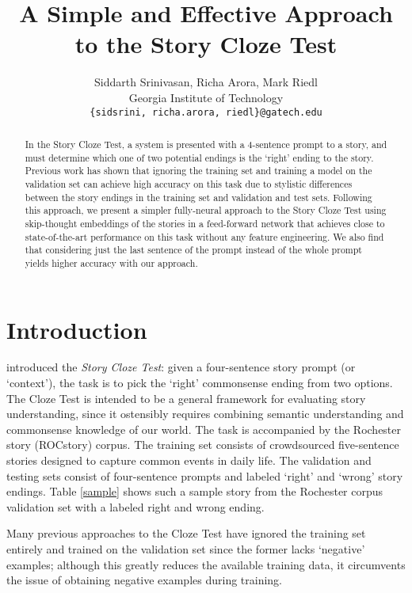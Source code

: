 \documentclass[11pt,a4paper]{article}
\title{A Simple and Effective Approach to the Story Cloze Test}
\author{Siddarth Srinivasan, Richa Arora, Mark Riedl \\
 Georgia Institute of Technology \\
  {\tt \{sidsrini, richa.arora, riedl\}@gatech.edu}}
\date{}
\begin{document}
\maketitle
\begin{abstract}
  In the Story Cloze Test, a system is presented with a 4-sentence prompt to a story, and must determine which one of two potential endings is the `right' ending to the story. Previous work has shown that ignoring the training set and training a model on the validation set can achieve high accuracy on this task due to stylistic differences between the story endings in the training set and validation and test sets. Following this approach, we present a simpler fully-neural approach to the Story Cloze Test using skip-thought embeddings of the stories in a feed-forward network that achieves close to state-of-the-art performance on this task without any feature engineering. We also find that considering just the last sentence of the prompt instead of the whole prompt yields higher accuracy with our approach.
\end{abstract}

\section{Introduction}

\citet{mostafazadeh2016corpus} introduced the {\em Story Cloze Test}: given a four-sentence story prompt (or `context'), the task is to pick the `right' commonsense ending from two options. The Cloze Test is intended to be a general framework for evaluating story understanding, since it ostensibly requires combining semantic understanding and commonsense knowledge of our world. The task is accompanied by the Rochester story (ROCstory) corpus.
The training set consists of crowdsourced five-sentence stories designed to capture common events in daily life.
The validation and testing sets consist of four-sentence prompts and labeled `right' and `wrong' story endings. Table \ref{sample} shows such a sample story from the Rochester corpus validation set with a labeled right and wrong ending. 

Many previous approaches to the Cloze Test have ignored the training set entirely and trained on the validation set since the former lacks `negative' examples; although this greatly reduces the available training data, it circumvents the issue of obtaining negative examples during training.
\end{document}

